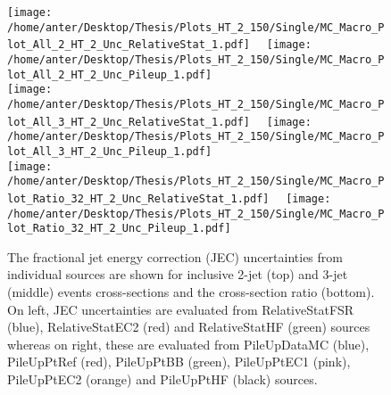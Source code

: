 \begin{figure}[!hbtp]
\hspace*{-5mm}\texttt{[image: /home/anter/Desktop/Thesis/Plots\_HT\_2\_150/Single/MC\_Macro\_Plot\_All\_2\_HT\_2\_Unc\_RelativeStat\_1.pdf]}%
~~\texttt{[image: /home/anter/Desktop/Thesis/Plots\_HT\_2\_150/Single/MC\_Macro\_Plot\_All\_2\_HT\_2\_Unc\_Pileup\_1.pdf]}\\
\hspace*{-5mm}\texttt{[image: /home/anter/Desktop/Thesis/Plots\_HT\_2\_150/Single/MC\_Macro\_Plot\_All\_3\_HT\_2\_Unc\_RelativeStat\_1.pdf]}%
~~\texttt{[image: /home/anter/Desktop/Thesis/Plots\_HT\_2\_150/Single/MC\_Macro\_Plot\_All\_3\_HT\_2\_Unc\_Pileup\_1.pdf]}\\
\hspace*{-5mm}\texttt{[image: /home/anter/Desktop/Thesis/Plots\_HT\_2\_150/Single/MC\_Macro\_Plot\_Ratio\_32\_HT\_2\_Unc\_RelativeStat\_1.pdf]}%
~~\texttt{[image: /home/anter/Desktop/Thesis/Plots\_HT\_2\_150/Single/MC\_Macro\_Plot\_Ratio\_32\_HT\_2\_Unc\_Pileup\_1.pdf]}
\caption[The fractional jet energy correction (JEC) uncertainties from individual sources (Part III).]{The fractional jet energy correction (JEC) uncertainties from individual sources are shown for inclusive 2-jet (top) and 3-jet (middle) events cross-sections and the cross-section ratio \ratio (bottom). On left, JEC uncertainties are evaluated from RelativeStatFSR (blue), RelativeStatEC2 (red) and RelativeStatHF (green) sources whereas on right, these are evaluated from PileUpDataMC (blue), PileUpPtRef (red), PileUpPtBB (green), PileUpPtEC1 (pink), PileUpPtEC2 (orange) and PileUpPtHF (black) sources.}
\label{fig:jes3}
\end{figure}


